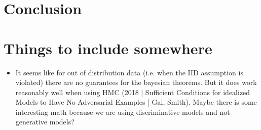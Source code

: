 \documentclass[11pt, A4, twoside]{report}
\begin{document}
\chapter{Conclusion}







\chapter{Things to include somewhere}
\begin{itemize}
  \item It seems like for out of distribution data (i.e. when the IID assumption is violated) there are no guarantees for the bayesian theorems. But it does work reasonably well when using HMC (2018 | Sufficient Conditions for idealized Models to Have No Adversarial Examples | Gal, Smith). Maybe there is some interesting math because we are using discriminative models and not generative models?
  

\end{itemize}
\end{document}
